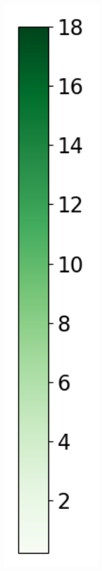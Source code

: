 \begin{figure}[H]
\begin{subfigure}[b]{0.075\textwidth}
        \includegraphics[width=1\textwidth]{Results/kd-laplace/kd-Laplace/heart-dataset/heatmap_legend_distance.png}
    \end{subfigure}
\end{figure}
\newpage
